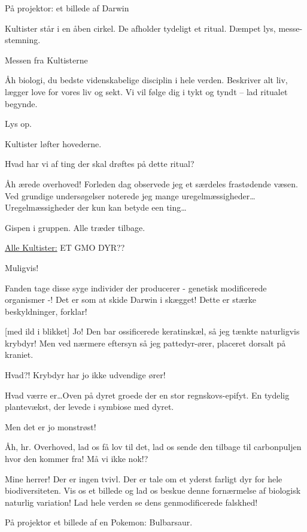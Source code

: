 \documentclass[a4paper,12pt]{article}
\begin{document}
\begin{sketch}

 På projektor: et billede af Darwin

\scene Kultister står i en åben cirkel. De afholder tydeligt et ritual. Dæmpet lys, messe-stemning.

\scene Messen fra Kultisterne

 Åh biologi, du bedste videnskabelige disciplin i hele verden. Beskriver alt liv, lægger love for vores liv og sekt. Vi vil følge dig i tykt og tyndt -- lad ritualet begynde.

Lys op. 

\scene Kultister løfter hovederne.

 Hvad har vi af ting der skal drøftes på dette ritual?

 Åh ærede overhoved! Forleden dag observede jeg et særdeles frastødende væsen. Ved grundige undersøgelser noterede jeg mange uregelmæssigheder\ldots  Uregelmæssigheder der kun kan betyde een ting\ldots 

\scene Gispen i gruppen. Alle træder tilbage.

\underline{Alle Kultister:} ET GMO DYR??

 Muligvis!

 Fanden tage disse syge individer der producerer - genetisk modificerede organismer -! Det er som at skide Darwin i skægget! Dette er stærke beskyldninger, forklar!

[med ild i blikket] Jo! Den bar ossificerede keratinskæl, så jeg tænkte naturligvis krybdyr! Men ved nærmere eftersyn så jeg pattedyr-ører, placeret dorsalt på kraniet.

 Hvad?! Krybdyr har jo ikke udvendige ører!

 Hvad værre er\ldots  Oven på dyret groede der en stor regnskovs-epifyt. En tydelig plantevækst, der levede i symbiose med dyret.

 Men det er jo monstrøst! 

 Åh, hr. Overhoved, lad os få lov til det, lad os sende den tilbage til carbonpuljen hvor den kommer fra! Må vi ikke nok!?


 Mine herrer! Der er ingen tvivl. Der er tale om et yderst farligt dyr for hele biodiversiteten. Vis os et billede og lad os beskue denne fornærmelse af biologisk naturlig variation! Lad hele verden se dens genmodificerede falskhed!

På projektor et billede af en Pokemon: Bulbarsaur.




\end{sketch}
\end{document}
